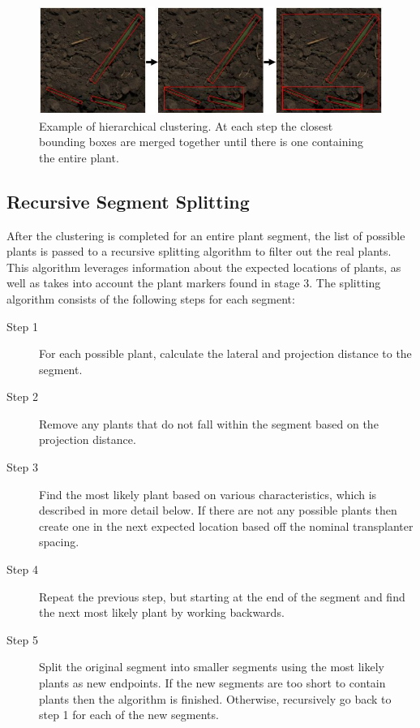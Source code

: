 \begin{figure}
	\centering
    \includegraphics[width=5in]{figures/clustering.jpg}
    \caption[Hierarchical clustering]{Example of hierarchical clustering. At each step the closest bounding boxes are merged together until there is one containing the entire plant.}
    \label{figure:clustering}
\end{figure}

\subsection{Recursive Segment Splitting}

After the clustering is completed for an entire plant segment, the list of possible plants is passed to a recursive splitting algorithm to filter out the real plants.  This algorithm leverages information about the expected locations of plants, as well as takes into account the plant markers found in stage 3.  The splitting algorithm consists of the following steps for each segment:

\begin{description}
\item[Step 1] For each possible plant, calculate the lateral and projection distance to the segment.  
\item[Step 2] Remove any plants that do not fall within the segment based on the projection distance.
\item[Step 3] Find the most likely plant based on various characteristics, which is described in more detail below.  If there are not any possible plants then create one in the next expected location based off the nominal transplanter spacing.  
\item[Step 4] Repeat the previous step, but starting at the end of the segment and find the next most likely plant by working backwards.
\item[Step 5] Split the original segment into smaller segments using the most likely plants as new endpoints.  If the new segments are too short to contain plants then the algorithm is finished.  Otherwise, recursively go back to step 1 for each of the new segments.
\end{description}

